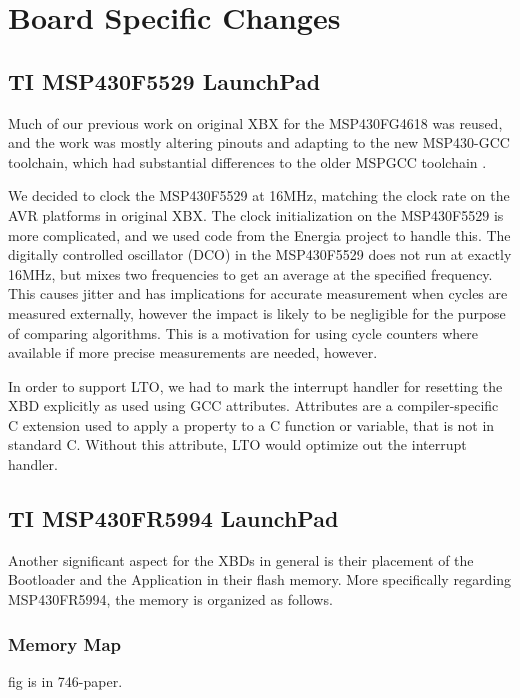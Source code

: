 \documentclass[twoside,11pt]{cergdoc}
\begin{document}
\chapter{Board Specific Changes}
  \section{TI MSP430F5529 LaunchPad\texttrademark}
Much of our previous work on original XBX for the MSP430FG4618 was reused, and
the work was mostly altering pinouts and adapting to the new MSP430-GCC
\cite{msp430-gcc} toolchain, which had substantial differences to the older
MSPGCC toolchain \cite{mspgcc}.

We decided to clock the MSP430F5529 at 16MHz, matching the clock rate on the AVR
platforms in original XBX. The clock initialization on the MSP430F5529 is more
complicated, and we used code from the Energia \cite{energia} project to handle
this. The digitally controlled oscillator (DCO) in the MSP430F5529 does not run
at exactly 16MHz, but mixes two frequencies to get an average at the specified
frequency. This causes jitter and has implications for accurate measurement when
cycles are measured externally, however the impact is likely to be negligible
for the purpose of comparing algorithms. This is a motivation for using cycle
counters where available if more precise measurements are needed, however.

In order to support LTO, we had to mark the interrupt handler for resetting the
XBD explicitly as used using GCC attributes. Attributes are a compiler-specific
C extension used to apply a property to a C function or variable, that is not in
standard C. Without this attribute, LTO would optimize out the interrupt
handler.

  \section{TI MSP430FR5994 LaunchPad\texttrademark}
Another significant aspect for the XBDs in general is their
placement of the Bootloader and the Application in their flash
memory. More specifically regarding MSP430FR5994, the
memory is organized as follows.

    \subsection{Memory Map}
fig is in 746-paper.
\end{document}
